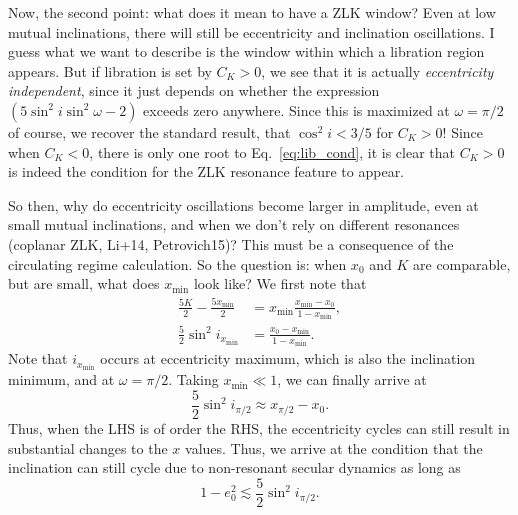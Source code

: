 \documentclass[12pt]{article}
\begin{document}
Now, the second point: what does it mean to have a ZLK window? Even at low
mutual inclinations, there will still be eccentricity and inclination
oscillations.
I guess what we want to describe is the window within which a libration region
appears.
But if libration is set by $C_K > 0$, we see that it is actually
\emph{eccentricity independent}, since it just depends on whether the expression
$(5\sin^2i\sin^2\omega - 2)$ exceeds zero anywhere.
Since this is maximized at $\omega = \pi/2$ of course, we recover the standard
result, that $\cos^2i < 3/5$ for $C_K > 0$!
Since when $C_K < 0$, there is only one root to Eq.~\eqref{eq:lib_cond}, it is
clear that $C_K > 0$ is indeed the condition for the ZLK resonance feature to
appear.

So then, why do eccentricity oscillations become larger in amplitude, even at
small mutual inclinations, and when we don't rely on different resonances
(coplanar ZLK, Li+14, Petrovich15)?
This must be a consequence of the circulating regime calculation.
So the question is: when $x_0$ and $K$ are comparable, but are small, what does
$x_{\min}$ look like?
We first note that
\begin{align}
    \frac{5K}{2} - \frac{5x_{\min}}{2}
        &= x_{\min}\frac{x_{\min} - x_0}{1 - x_{\min}},\\
    \frac{5}{2}\sin^2 i_{x_{\min}}
        &= \frac{x_0 - x_{\min}}{1 - x_{\min}}.
\end{align}
Note that $i_{x_{\min}}$ occurs at eccentricity maximum, which is also the
inclination minimum, and at $\omega = \pi/2$. Taking $x_{\min} \ll 1$, we can
finally arrive at
\begin{equation}
    \frac{5}{2}\sin^2 i_{\pi/2}
        \approx x_{\pi/2} - x_0.
\end{equation}
Thus, when the LHS is of order the RHS, the eccentricity cycles can still result
in substantial changes to the $x$ values. Thus, we arrive at the condition that
the inclination can still cycle due to non-resonant secular dynamics as long as
\begin{equation}
    1 - e_0^2 \lesssim \frac{5}{2}\sin^2 i_{\pi/2}.
\end{equation}
\end{document}
